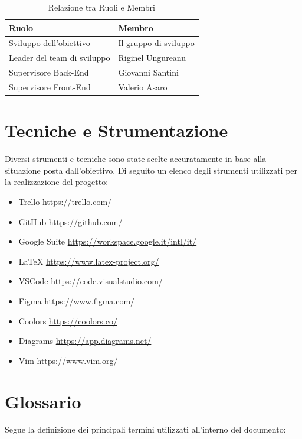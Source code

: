 \documentclass{report}
\begin{document}
\begin{table}[!ht]
	\begin{center} %
		\centering
		\begin{tabular}{ |p{5cm}|p{5cm}|  }
			\hline
			\centering Ruolo & \qquad\qquad\quad Membro \\ %
			\hline
			Sviluppo dell'obiettivo & Il gruppo di sviluppo \\
			\hline
			Leader del team di sviluppo & Riginel Ungureanu \\
			\hline
			Supervisore Back-End &
			Giovanni Santini \\
			\hline
			Supervisore Front-End & Valerio Asaro\\
			\hline
		\end{tabular}
		\caption{Relazione tra Ruoli e Membri}
	\end{center}
\end{table}

\chapter{Tecniche e Strumentazione}
Diversi strumenti e tecniche sono state scelte accuratamente in base alla situazione posta dall’obiettivo. Di seguito un elenco degli strumenti utilizzati per la realizzazione del progetto:

\begin{itemize}
	\item Trello \qquad \url{https://trello.com/}
	\item GitHub \qquad \url{https://github.com/}
	\item Google Suite \qquad \url{https://workspace.google.it/intl/it/}
	\item LaTeX \qquad \url{https://www.latex-project.org/}
	\item VSCode \qquad \url{https://code.visualstudio.com/}
	\item Figma \qquad \url{https://www.figma.com/}
	\item Coolors \qquad \url{https://coolors.co/}
	\item Diagrams \qquad \url{https://app.diagrams.net/}
	\item Vim \qquad \url{https://www.vim.org/}
\end{itemize}

\chapter{Glossario}
Segue la definizione dei principali termini utilizzati all'interno del documento:
\end{document}
